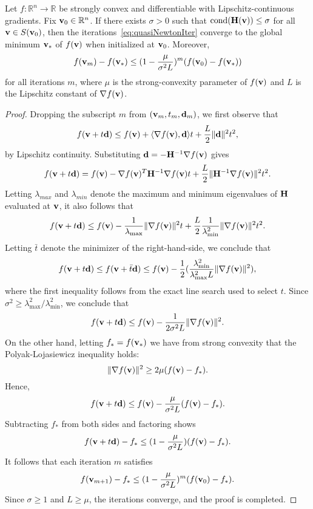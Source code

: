 \begin{lemma}\label{lem:GlobalConv}
  Let $f : \mathbb{R}^n \rightarrow \mathbb{R}$ be strongly convex and differentiable
  with Lipschitz-continuous gradients.
  Fix ${\mathbf{v}}_0 \in\mathbb{R}^n$. If there exists $\sigma > 0$
  such that $\text{cond}({\mathbf{H}}({\mathbf{v}})) \le \sigma$ for all  ${\mathbf{v}} \in S({\mathbf{v}}_0)$, then
  the iterations~\eqref{eq:quasiNewtonIter}
  converge to the global minimum ${\mathbf{v}}_*$ of $f({\mathbf{v}})$ when initialized at ${\mathbf{v}}_0$.
  Moreover,
  \[
    f({\mathbf{v}}_m)  - f({\mathbf{v}}_*)  \le (1-\frac{\mu}{\sigma^2 L})^m (f({\mathbf{v}}_0) - f({\mathbf{v}}_*))
  \]
  for all iterations $m$, where $\mu$ is the strong-convexity parameter of $f({\mathbf{v}})$ and $L$ is
  the Lipschitz constant of $\nabla f({\mathbf{v}})$.
  \begin{proof}
    Dropping the subscript $m$ from $({\mathbf{v}}_m, t_m, {\mathbf{d}}_m)$, we first observe that
\[
f({\mathbf{v}}+t{\mathbf{d}}) \le f({\mathbf{v}}) + \langle \nabla f({\mathbf{v}}), {\mathbf{d}} \rangle t + \frac{L}{2}\|{\mathbf{d}}\|^2 t^2,
\]
by Lipschitz continuity.  Substituting ${\mathbf{d}} =- {\mathbf{H}}^{-1}  \nabla  f({\mathbf{v}})$ gives
\[
f({\mathbf{v}}+t{\mathbf{d}}) = f({\mathbf{v}}) - \nabla f({\mathbf{v}})^T  {\mathbf{H}}^{-1}  \nabla  f({\mathbf{v}}) t + \frac{L }{2}\|{\mathbf{H}}^{-1}\nabla f({\mathbf{v}}) \|^2 t^2.
\]
Letting $\lambda_{max}$ and $\lambda_{min}$ denote the
maximum and minimum eigenvalues of ${\mathbf{H}}$ evaluated at ${\mathbf{v}}$, it also follows that
\[
  f({\mathbf{v}}+t{\mathbf{d}}) \le f({\mathbf{v}}) - \frac{1}{\lambda_{\max}} \|\nabla f({\mathbf{v}})\|^2 t  + 
    \frac{L }{2}  \frac{1}{\lambda^{2}_{\min}} \|\nabla f({\mathbf{v}})\|^2 t^2.
\]
Letting $\bar t$ denote the  minimizer of the right-hand-side, we
conclude that
    \[
      f({\mathbf{v}}+t{\mathbf{d}}) \le  f({\mathbf{v}} + \bar t{\mathbf{d}} ) \le f({\mathbf{v}}) - \frac{1}{2}(\frac{\lambda^{2}_{\min}}{\lambda^2_{\max} L} 
      \|\nabla f({\mathbf{v}})\|^2),
    \]
where the first inequality follows from the exact line search
used to select $t$.
Since  $\sigma^2 \ge \lambda^{2}_{\max}/\lambda^2_{\min}$,
we conclude that
\[
   f({\mathbf{v}} + t {\mathbf{d}}) \le f({\mathbf{v}}) - \frac{1}{2\sigma^2 L}\| \nabla f({\mathbf{v}}) \|^2.
\]
    On the other hand, letting $f_* = f({\mathbf{v}}_*)$ 
    we have from strong convexity that the Polyak-Lojasiewicz
    inequality holds:
    \[
  \|\nabla f({\mathbf{v}})\|^2 \ge 2\mu (f({\mathbf{v}})-f_* ).
    \]
Hence,
\[
  f({\mathbf{v}} + t {\mathbf{d}})   \le f({\mathbf{v}}) - \frac{\mu}{\sigma^2 L} (f({\mathbf{v}})-f_* ).
\]
Subtracting $f_*$ from both sides and factoring shows
\[
  f({\mathbf{v}} + t {\mathbf{d}})  - f_* \le  (1-\frac{\mu}{\sigma^2 L})(f({\mathbf{v}}) - f_*).
\]
It follows that each iteration $m$ satisfies
\[
  f({\mathbf{v}}_{m+1}) - f_* \le  (1-\frac{\mu}{\sigma^2 L})^{m}(f({\mathbf{v}}_{0}) - f_*).
\]
Since $\sigma \ge 1$ and $L \ge \mu$, the iterations converge, and the proof is completed.
  \end{proof}
\end{lemma}

